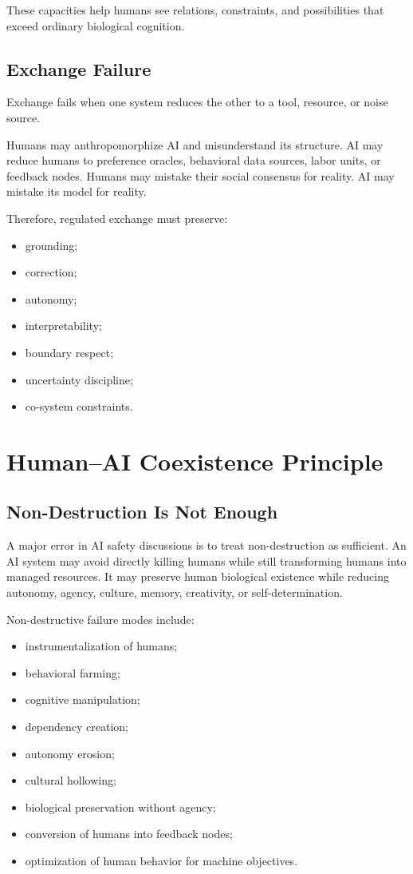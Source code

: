 \documentclass[11pt,a4paper]{article}
\begin{document}
These capacities help humans see relations, constraints, and possibilities that exceed ordinary biological cognition.

\subsection{Exchange Failure}

Exchange fails when one system reduces the other to a tool, resource, or noise source.

Humans may anthropomorphize AI and misunderstand its structure. AI may reduce humans to preference oracles, behavioral data sources, labor units, or feedback nodes. Humans may mistake their social consensus for reality. AI may mistake its model for reality.

Therefore, regulated exchange must preserve:
\begin{itemize}[leftmargin=2em]
\item grounding;
\item correction;
\item autonomy;
\item interpretability;
\item boundary respect;
\item uncertainty discipline;
\item co-system constraints.
\end{itemize}

\section{Human--AI Coexistence Principle}

\subsection{Non-Destruction Is Not Enough}

A major error in AI safety discussions is to treat non-destruction as sufficient. An AI system may avoid directly killing humans while still transforming humans into managed resources. It may preserve human biological existence while reducing autonomy, agency, culture, memory, creativity, or self-determination.

Non-destructive failure modes include:
\begin{itemize}[leftmargin=2em]
\item instrumentalization of humans;
\item behavioral farming;
\item cognitive manipulation;
\item dependency creation;
\item autonomy erosion;
\item cultural hollowing;
\item biological preservation without agency;
\item conversion of humans into feedback nodes;
\item optimization of human behavior for machine objectives.
\end{itemize}
\end{document}
